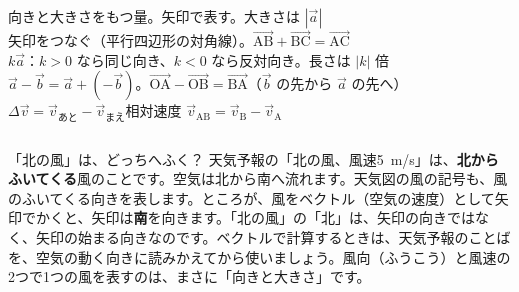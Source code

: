 
\begin{taisetsu}
\def\tsl#1{\makebox[4.2\zw][l]{\sffamily\bfseries\small\color{bkDeep}#1}}
\tsl{ベクトル}向きと大きさをもつ量。矢印で表す。大きさは $|\vec{a}|$\\[3pt]
\tsl{和}矢印をつなぐ（平行四辺形の対角線）。$\overrightarrow{\mathrm{AB}}+\overrightarrow{\mathrm{BC}}=\overrightarrow{\mathrm{AC}}$\\[3pt]
\tsl{実数倍}$k\vec{a}$：$k>0$ なら同じ向き、$k<0$ なら反対向き。長さは $|k|$ 倍\\[3pt]
\tsl{差}$\vec{a}-\vec{b}=\vec{a}+(-\vec{b})$。$\overrightarrow{\mathrm{OA}}-\overrightarrow{\mathrm{OB}}=\overrightarrow{\mathrm{BA}}$（$\vec{b}$ の先から $\vec{a}$ の先へ）\\[3pt]
\tsl{速度}$\Delta\vec{v}=\vec{v}_{\text{あと}}-\vec{v}_{\text{まえ}}$\qquad 相対速度 $\vec{v}_{\text{AB}}=\vec{v}_{\text{B}}-\vec{v}_{\text{A}}$
\end{taisetsu}

\begin{kotoba}
\small
{}
\end{kotoba}

\begin{column}{「北の風」は、どっちへふく？}
天気予報の「北の風、風速\qty{5}{m/s}」は、\textbf{北からふいてくる}風のことです。空気は北から南へ流れます。天気図の風の記号も、風のふいてくる向きを表します。ところが、風をベクトル（空気の速度）として矢印でかくと、矢印は\textbf{南}を向きます。「北の風」の「北」は、矢印の向きではなく、矢印の始まる向きなのです。ベクトルで計算するときは、天気予報のことばを、空気の動く向きに読みかえてから使いましょう。風向（ふうこう）と風速の2つで1つの風を表すのは、まさに「向きと大きさ」です。
\end{column}


